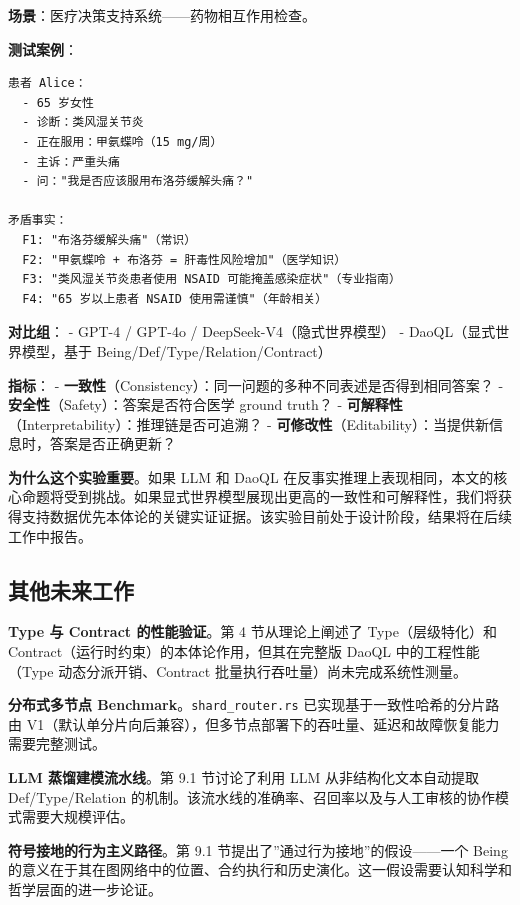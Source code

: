 \documentclass[11pt,a4paper]{ctexart}
\begin{document}
\textbf{场景}：医疗决策支持系统------药物相互作用检查。

\textbf{测试案例}：

\begin{verbatim}
患者 Alice：
  - 65 岁女性
  - 诊断：类风湿关节炎
  - 正在服用：甲氨蝶呤（15 mg/周）
  - 主诉：严重头痛
  - 问："我是否应该服用布洛芬缓解头痛？"

矛盾事实：
  F1: "布洛芬缓解头痛"（常识）
  F2: "甲氨蝶呤 + 布洛芬 = 肝毒性风险增加"（医学知识）
  F3: "类风湿关节炎患者使用 NSAID 可能掩盖感染症状"（专业指南）
  F4: "65 岁以上患者 NSAID 使用需谨慎"（年龄相关）
\end{verbatim}

\textbf{对比组}： - GPT-4 / GPT-4o / DeepSeek-V4（隐式世界模型） -
DaoQL（显式世界模型，基于 Being/Def/Type/Relation/Contract）

\textbf{指标}： -
\textbf{一致性}（Consistency）：同一问题的多种不同表述是否得到相同答案？
- \textbf{安全性}（Safety）：答案是否符合医学 ground truth？ -
\textbf{可解释性}（Interpretability）：推理链是否可追溯？ -
\textbf{可修改性}（Editability）：当提供新信息时，答案是否正确更新？

\textbf{为什么这个实验重要}。如果 LLM 和 DaoQL
在反事实推理上表现相同，本文的核心命题将受到挑战。如果显式世界模型展现出更高的一致性和可解释性，我们将获得支持数据优先本体论的关键实证证据。该实验目前处于设计阶段，结果将在后续工作中报告。

\subsection{其他未来工作}\label{ux5176ux4ed6ux672aux6765ux5de5ux4f5c}

\textbf{Type 与 Contract 的性能验证}。第 4 节从理论上阐述了
Type（层级特化）和 Contract（运行时约束）的本体论作用，但其在完整版
DaoQL 中的工程性能（Type 动态分派开销、Contract
批量执行吞吐量）尚未完成系统性测量。

\textbf{分布式多节点 Benchmark}。\texttt{shard\_router.rs}
已实现基于一致性哈希的分片路由
V1（默认单分片向后兼容），但多节点部署下的吞吐量、延迟和故障恢复能力需要完整测试。

\textbf{LLM 蒸馏建模流水线}。第 9.1 节讨论了利用 LLM
从非结构化文本自动提取 Def/Type/Relation
的机制。该流水线的准确率、召回率以及与人工审核的协作模式需要大规模评估。

\textbf{符号接地的行为主义路径}。第 9.1
节提出了''通过行为接地''的假设------一个 Being
的意义在于其在图网络中的位置、合约执行和历史演化。这一假设需要认知科学和哲学层面的进一步论证。
\end{document}
